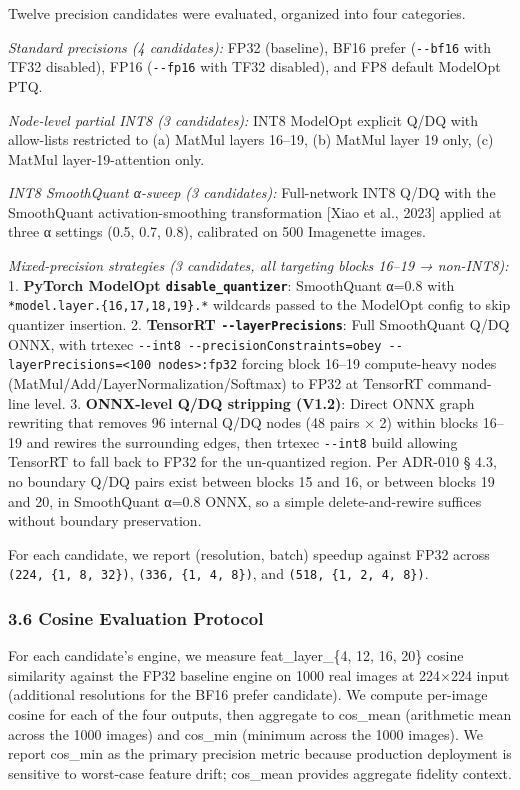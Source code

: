 \documentclass[
]{article}
\begin{document}
Twelve precision candidates were evaluated, organized into four
categories.

\emph{Standard precisions (4 candidates):} FP32 (baseline), BF16 prefer
(\texttt{-\/-bf16} with TF32 disabled), FP16 (\texttt{-\/-fp16} with
TF32 disabled), and FP8 default ModelOpt PTQ.

\emph{Node-level partial INT8 (3 candidates):} INT8 ModelOpt explicit
Q/DQ with allow-lists restricted to (a) MatMul layers 16--19, (b) MatMul
layer 19 only, (c) MatMul layer-19-attention only.

\emph{INT8 SmoothQuant α-sweep (3 candidates):} Full-network INT8 Q/DQ
with the SmoothQuant activation-smoothing transformation {[}Xiao et al.,
2023{]} applied at three α settings (0.5, 0.7, 0.8), calibrated on 500
Imagenette images.

\emph{Mixed-precision strategies (3 candidates, all targeting blocks
16--19 → non-INT8):} 1. \textbf{PyTorch ModelOpt
\texttt{disable\_quantizer}}: SmoothQuant α=0.8 with
\texttt{*model.layer.\{16,17,18,19\}.*} wildcards passed to the ModelOpt
config to skip quantizer insertion. 2. \textbf{TensorRT
\texttt{-\/-layerPrecisions}}: Full SmoothQuant Q/DQ ONNX, with trtexec
\texttt{-\/-int8\ -\/-precisionConstraints=obey\ -\/-layerPrecisions=\textless{}100\ nodes\textgreater{}:fp32}
forcing block 16--19 compute-heavy nodes
(MatMul/Add/LayerNormalization/Softmax) to FP32 at TensorRT command-line
level. 3. \textbf{ONNX-level Q/DQ stripping (V1.2)}: Direct ONNX graph
rewriting that removes 96 internal Q/DQ nodes (48 pairs × 2) within
blocks 16--19 and rewires the surrounding edges, then trtexec
\texttt{-\/-int8} build allowing TensorRT to fall back to FP32 for the
un-quantized region. Per ADR-010 § 4.3, no boundary Q/DQ pairs exist
between blocks 15 and 16, or between blocks 19 and 20, in SmoothQuant
α=0.8 ONNX, so a simple delete-and-rewire suffices without boundary
preservation.

For each candidate, we report (resolution, batch) speedup against FP32
across \texttt{(224,\ \{1,\ 8,\ 32\})}, \texttt{(336,\ \{1,\ 4,\ 8\})},
and \texttt{(518,\ \{1,\ 2,\ 4,\ 8\})}.

\subsubsection{3.6 Cosine Evaluation
Protocol}\label{cosine-evaluation-protocol}

For each candidate's engine, we measure feat\_layer\_\{4, 12, 16, 20\}
cosine similarity against the FP32 baseline engine on 1000 real images
at 224×224 input (additional resolutions for the BF16 prefer candidate).
We compute per-image cosine for each of the four outputs, then aggregate
to cos\_mean (arithmetic mean across the 1000 images) and cos\_min
(minimum across the 1000 images). We report cos\_min as the primary
precision metric because production deployment is sensitive to
worst-case feature drift; cos\_mean provides aggregate fidelity context.
\end{document}
